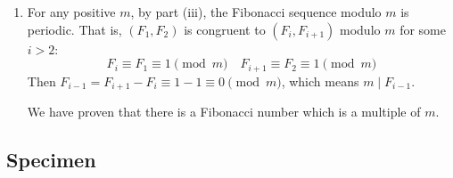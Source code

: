 \begin{enumerate}
\begin{solution}
\begin{enumerate}[label=(\roman*)]
\item For any positive $m$, by part (iii), the Fibonacci sequence modulo $m$ is periodic. That is, $(F_1,F_2)$ is congruent to $(F_i,F_{i+1})$ modulo $m$ for some $i>2$:
\[ F_i \equiv F_1 \equiv 1 \pmod m \quad F_{i+1} \equiv F_2 \equiv 1 \pmod m \]
Then $F_{i-1}=F_{i+1}-F_i\equiv1-1\equiv0\pmod m$, which means $m\mid F_{i-1}$.

We have proven that there is a Fibonacci number which is a multiple of $m$.
\end{enumerate}
\end{solution}
\end{enumerate}
\pagebreak

\subsection*{Specimen}

